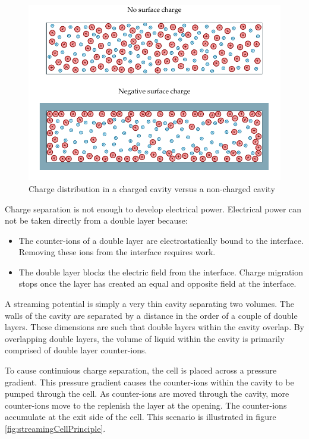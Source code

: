 \begin{figure}
    \centering
    \includegraphics{content/pt1/01-PowerHarvesting/graphics/ionsInABox.pdf}
    \caption{\label{fig:ionsInABox}Charge distribution in a charged cavity versus a non-charged cavity}
\end{figure}

Charge separation is not enough to develop electrical power.
Electrical power can not be taken directly from a double layer because:
\begin{itemize}
    \item The counter-ions of a double layer are electrostatically bound to the interface.
        Removing these ions from the interface requires work.
    \item The double layer blocks the electric field from the interface.
        Charge migration stops once the layer has created an equal and opposite field at the interface.
\end{itemize}

A streaming potential is simply a very thin cavity separating two volumes.
The walls of the cavity are separated by a distance in the order of a couple of double layers.
These dimensions are such that double layers within the cavity overlap.
By overlapping double layers, the volume of liquid within the cavity is primarily comprised of double layer counter-ions.

To cause continuious charge separation, the cell is placed across a pressure gradient.
This pressure gradient causes the counter-ions within the cavity to be pumped through the cell.
As counter-ions are moved through the cavity, more counter-ions move to the replenish the layer at the opening.
The counter-ions accumulate at the exit side of the cell.
This scenario is illustrated in figure \ref{fig:streamingCellPrinciple}.

